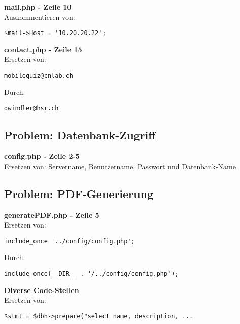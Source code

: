 \textbf{mail.php - Zeile 10} \\

\noindent Auskommentieren von:
\begin{lstlisting}[backgroundcolor = \color{lightgray}]
$mail->Host = '10.20.20.22';
\end{lstlisting}

\bigskip
\noindent\textbf{contact.php - Zeile 15} \\
\noindent Ersetzen von:
\begin{lstlisting}[backgroundcolor = \color{lightgray}]
mobilequiz@cnlab.ch
\end{lstlisting}

\bigskip
\noindent Durch:
\begin{lstlisting}[backgroundcolor = \color{lightgray}]
dwindler@hsr.ch
\end{lstlisting}



\subsection{Problem: Datenbank-Zugriff}

\textbf{config.php - Zeile 2-5} \\

\noindent Ersetzen von: Servername, Benutzername, Passwort und Datenbank-Name


\subsection{Problem: PDF-Generierung}

\textbf{generatePDF.php - Zeile 5} \\

\noindent Ersetzen von:
\begin{lstlisting}[backgroundcolor = \color{lightgray}]
include_once '../config/config.php';
\end{lstlisting}

\bigskip
\noindent Durch:
\begin{lstlisting}[backgroundcolor = \color{lightgray}]
include_once(__DIR__ . '/../config/config.php');
\end{lstlisting}

\bigskip
\noindent\textbf{Diverse Code-Stellen} \\

\noindent Ersetzen von:
\begin{lstlisting}[backgroundcolor = \color{lightgray}]
$stmt = $dbh->prepare("select name, description, ...
\end{lstlisting}

